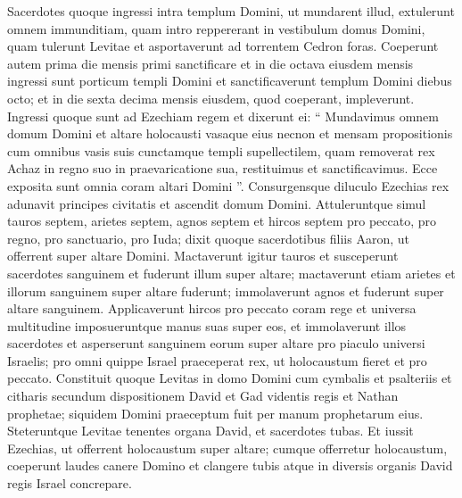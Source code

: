 \begin{biblechapter}
\begin{biblechapter}
\begin{biblechapter}
\begin{biblechapter}
\begin{biblechapter}
\begin{biblechapter}
\begin{biblechapter}
\begin{biblechapter}
\begin{biblechapter}
\begin{biblechapter}
\begin{biblechapter}
\begin{biblechapter}
\begin{biblechapter}
\begin{biblechapter}
\begin{biblechapter}
\begin{biblechapter}
\begin{biblechapter}
\begin{biblechapter}
\begin{biblechapter}
\begin{biblechapter}
\begin{biblechapter}
\begin{biblechapter}
\begin{biblechapter}
\begin{biblechapter}
\begin{biblechapter}
\begin{biblechapter}
\begin{biblechapter}
\begin{biblechapter}
\begin{biblechapter}
\verse Sacerdotes quoque ingressi intra templum Domini, ut mundarent illud, extulerunt omnem immunditiam, quam intro reppererant in vestibulum domus Domini, quam tulerunt Levitae et asportaverunt ad torrentem Cedron foras. 
\verse Coeperunt autem prima die mensis primi sanctificare et in die octava eiusdem mensis ingressi sunt porticum templi Domini et sanctificaverunt templum Domini diebus octo; et in die sexta decima mensis eiusdem, quod coeperant, impleverunt. 
 \verse Ingressi quoque sunt ad Ezechiam regem et dixerunt ei: “ Mundavimus omnem domum Domini et altare holocausti vasaque eius necnon et mensam propositionis cum omnibus vasis suis 
\verse cunctamque templi supellectilem, quam removerat rex Achaz in regno suo in praevaricatione sua, restituimus et sanctificavimus. Ecce exposita sunt omnia coram altari Domini ”.
 \verse Consurgensque diluculo Ezechias rex adunavit principes civitatis et ascendit domum Domini. 
\verse Attuleruntque simul tauros septem, arietes septem, agnos septem et hircos septem pro peccato, pro regno, pro sanctuario, pro Iuda; dixit quoque sacerdotibus filiis Aaron, ut offerrent super altare Domini. 
\verse Mactaverunt igitur tauros et susceperunt sacerdotes sanguinem et fuderunt illum super altare; mactaverunt etiam arietes et illorum sanguinem super altare fuderunt; immolaverunt agnos et fuderunt super altare sanguinem. 
\verse Applicaverunt hircos pro peccato coram rege et universa multitudine imposueruntque manus suas super eos, 
\verse et immolaverunt illos sacerdotes et asperserunt sanguinem eorum super altare pro piaculo universi Israelis; pro omni quippe Israel praeceperat rex, ut holocaustum fieret et pro peccato.
 \verse Constituit quoque Levitas in domo Domini cum cymbalis et psalteriis et citharis secundum dispositionem David et Gad videntis regis et Nathan prophetae; siquidem Domini praeceptum fuit per manum prophetarum eius. 
\verse Steteruntque Levitae tenentes organa David, et sacerdotes tubas. 
\verse Et iussit Ezechias, ut offerrent holocaustum super altare; cumque offerretur holocaustum, coeperunt laudes canere Domino et clangere tubis atque in diversis organis David regis Israel concrepare. 

\end{biblechapter}
\end{biblechapter}
\end{biblechapter}
\end{biblechapter}
\end{biblechapter}
\end{biblechapter}
\end{biblechapter}
\end{biblechapter}
\end{biblechapter}
\end{biblechapter}
\end{biblechapter}
\end{biblechapter}
\end{biblechapter}
\end{biblechapter}
\end{biblechapter}
\end{biblechapter}
\end{biblechapter}
\end{biblechapter}
\end{biblechapter}
\end{biblechapter}
\end{biblechapter}
\end{biblechapter}
\end{biblechapter}
\end{biblechapter}
\end{biblechapter}
\end{biblechapter}
\end{biblechapter}
\end{biblechapter}
\end{biblechapter}
